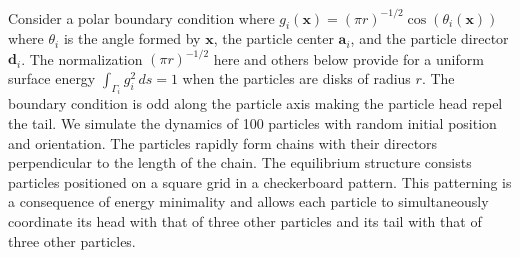 Consider a polar boundary condition where
$g_i(\mathbf{x}) = (\pi r)^{-1/2} \cos (\theta_i(\mathbf{x}))$
where $\theta_i$ is the angle formed by $\mathbf{x}$, the particle
center $\mathbf{a}_i$, and the particle director $\mathbf{d}_i$.
The normalization $(\pi r)^{-1/2}$ here and others below
provide for a uniform surface energy $\int_{\Gamma_i} g_i^2 \,ds = 1$
when the particles are disks of radius $r$.
The boundary condition is odd along the particle axis 
making the particle head repel the tail.
We simulate the dynamics of 100 particles with random initial position
and orientation. The particles rapidly form chains with their
directors perpendicular to the length of the chain. The equilibrium
structure consists particles positioned on a square grid
in a checkerboard pattern. This patterning is a consequence of energy
minimality and allows each particle to simultaneously
coordinate its head with that of three other particles
and its tail with that of three other particles. 

